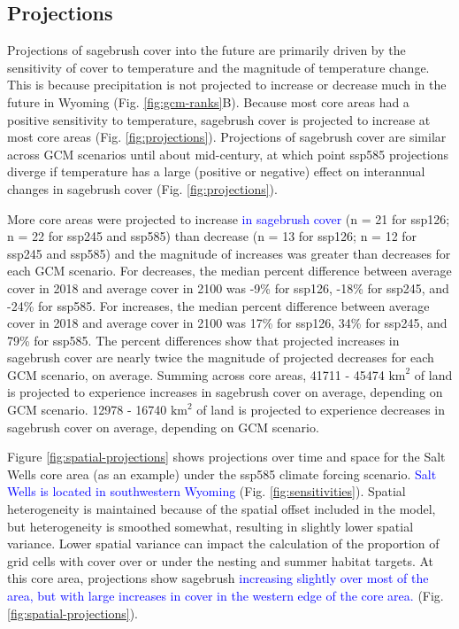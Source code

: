 \documentclass[
  12pt,
]{article}
\begin{document}
\hypertarget{projections}{%
\subsection{Projections}\label{projections}}

Projections of sagebrush cover into the future are primarily driven by the sensitivity of cover to temperature and the magnitude of temperature change.
This is because precipitation is not projected to increase or decrease much in the future in Wyoming (Fig. \ref{fig:gcm-ranks}B).
Because most core areas had a positive sensitivity to temperature, sagebrush cover is projected to increase at most core areas (Fig. \ref{fig:projections}).
Projections of sagebrush cover are similar across GCM scenarios until about mid-century, at which point ssp585 projections diverge if temperature has a large (positive or negative) effect on interannual changes in sagebrush cover (Fig. \ref{fig:projections}).

More core areas were projected to increase \textcolor{blue}{in sagebrush cover} (n = 21 for ssp126; n = 22 for ssp245 and ssp585) than decrease (n = 13 for ssp126; n = 12 for ssp245 and ssp585) and the magnitude of increases was greater than decreases for each GCM scenario.
For decreases, the median percent difference between average cover in 2018 and average cover in 2100 was -9\% for ssp126, -18\% for ssp245, and -24\% for ssp585.
For increases, the median percent difference between average cover in 2018 and average cover in 2100 was 17\% for ssp126, 34\% for ssp245, and 79\% for ssp585.
The percent differences show that projected increases in sagebrush cover are nearly twice the magnitude of projected decreases for each GCM scenario, on average.
Summing across core areas, 41711 - 45474 \(\text{km}^2\) of land is projected to experience increases in sagebrush cover on average, depending on GCM scenario.
12978 - 16740 \(\text{km}^2\) of land is projected to experience decreases in sagebrush cover on average, depending on GCM scenario.

Figure \ref{fig:spatial-projections} shows projections over time and space for the Salt Wells core area (as an example) under the ssp585 climate forcing scenario.
\textcolor{blue}{Salt Wells is located in southwestern Wyoming} (Fig. \ref{fig:sensitivities}).
Spatial heterogeneity is maintained because of the spatial offset included in the model, but heterogeneity is smoothed somewhat, resulting in slightly lower spatial variance.
Lower spatial variance can impact the calculation of the proportion of grid cells with cover over or under the nesting and summer habitat targets.
At this core area, projections show sagebrush \textcolor{blue}{increasing slightly over most of the area, but with large increases in cover in the western edge of the core area.} (Fig. \ref{fig:spatial-projections}).
\end{document}
